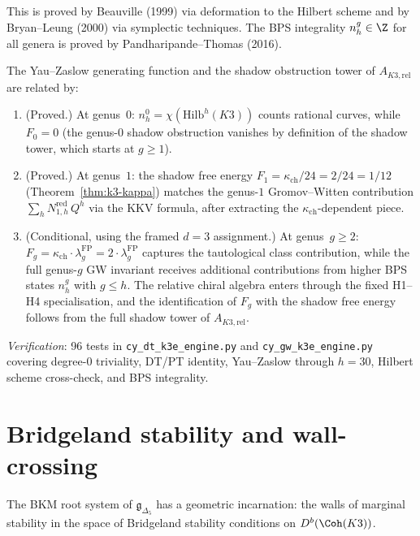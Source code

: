 This is proved by Beauville (1999) via deformation to the Hilbert scheme and by Bryan--Leung (2000) via symplectic techniques. The BPS integrality $n_h^g \in \Z$ for all genera is proved by Pandharipande--Thomas (2016).

\begin{proposition}
\label{prop:k3e-bps-shadow}
The Yau--Zaslow generating function and the shadow obstruction tower of $A_{K3,\mathrm{rel}}$ are related by:
\begin{enumerate}[label=(\roman*)]
 \item \textup{(Proved.)} At genus~$0$: $n_h^0 = \chi(\mathrm{Hilb}^h(K3))$ counts rational curves, while $F_0 = 0$ (the genus-$0$ shadow obstruction vanishes by definition of the shadow tower, which starts at $g \geq 1$).
 \item \textup{(Proved.)} At genus~$1$: the shadow free energy $F_1 = \kappa_{\mathrm{ch}} / 24 = 2/24 = 1/12$ (Theorem~\ref{thm:k3-kappa}) matches the genus-$1$ Gromov--Witten contribution $\sum_h N_{1,h}^{\mathrm{red}} \, Q^h$ via the KKV formula, after extracting the $\kappa_{\mathrm{ch}}$-dependent piece.
 \item \textup{(Conditional, using the framed $d=3$ assignment.)} At genus~$g \geq 2$: $F_g = \kappa_{\mathrm{ch}} \cdot \lambda_g^{\mathrm{FP}} = 2 \cdot \lambda_g^{\mathrm{FP}}$ captures the tautological class contribution, while the full genus-$g$ GW invariant receives additional contributions from higher BPS states $n_h^g$ with $g \leq h$. The relative chiral algebra enters through the fixed H1--H4 specialisation, and the identification of $F_g$ with the shadow free energy follows from the full shadow tower of $A_{K3,\mathrm{rel}}$.
\end{enumerate}
\end{proposition}

\noindent\textit{Verification}: 96 tests in \texttt{cy\_dt\_k3e\_engine.py} and \texttt{cy\_gw\_k3e\_engine.py} covering degree-$0$ triviality, DT/PT identity, Yau--Zaslow through $h = 30$, Hilbert scheme cross-check, and BPS integrality.


\section{Bridgeland stability and wall-crossing}
\label{sec:k3e-wall-crossing}

The BKM root system of $\mathfrak{g}_{\Delta_5}$ has a geometric incarnation: the walls of marginal stability in the space of Bridgeland stability conditions on $D^b(\Coh(K3))$.

